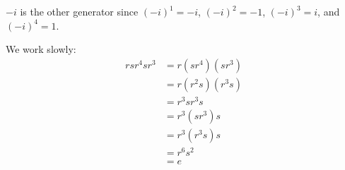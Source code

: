\begin{questions}
    \item $-i$ is the other generator since $(-i)^1 = -i$, $(-i)^2 = -1$, $(-i)^3 = i$, and $(-i)^4 = 1$.

    \item We work slowly:
    \begin{align*}
        rsr^4sr^3 &= r(sr^4)(sr^3)\\
        &= r(r^2s)(r^3s)\\
        &= r^3sr^3s\\
        &= r^3(sr^3)s\\
        &= r^3(r^3s)s\\
        &= r^6s^2\\
        &= e
    \end{align*}
\end{questions}

